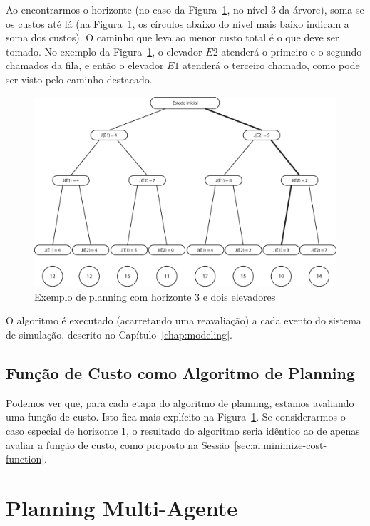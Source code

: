 Ao encontrarmos o horizonte (no caso da Figura~\ref{fig:planning}, no nível 3 da
árvore), soma-se os custos até lá (na Figura~\ref{fig:planning}, os círculos
abaixo do nível mais baixo indicam a soma dos custos). O caminho que leva ao
menor custo total é o que deve ser tomado. No exemplo da Figura~\ref{fig:planning}, o
elevador $E2$ atenderá o primeiro e o segundo chamados da fila, e então o
elevador $E1$ atenderá o terceiro chamado, como pode ser visto pelo caminho destacado.

\begin{figure}[htb!]
  \centering
  \includegraphics[scale=0.6]{img/planning.eps}
  \caption{Exemplo de planning com horizonte 3 e dois elevadores}
\label{fig:planning}
\end{figure}

O algoritmo é executado (acarretando uma reavaliação) a cada evento do sistema
de simulação, descrito no Capítulo~\ref{chap:modeling}.

\subsection{Função de Custo como Algoritmo de Planning}

Podemos ver que, para cada etapa do algoritmo de planning, estamos avaliando uma
função de custo. Isto fica mais explícito na Figura~\ref{fig:planning}. Se
considerarmos o caso especial de horizonte 1, o resultado do algoritmo seria
idêntico ao de apenas avaliar a função de custo, como proposto na
Sessão~\ref{sec:ai:minimize-cost-function}.

\section{Planning Multi-Agente}

